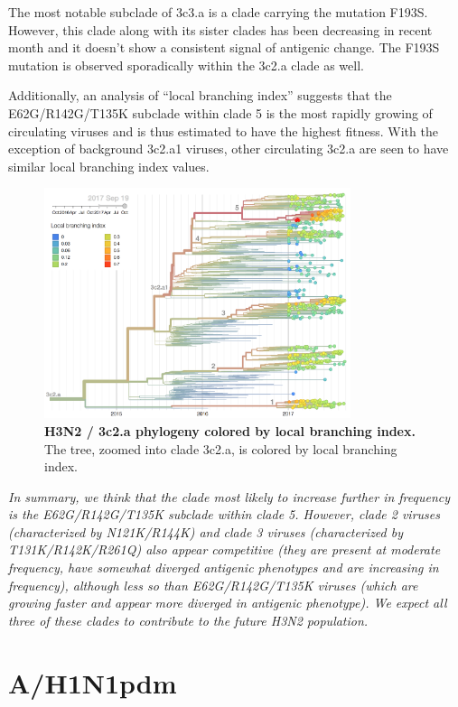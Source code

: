 \documentclass[11pt,oneside,letterpaper]{article}
\begin{document}
The most notable subclade of 3c3.a is a clade carrying the mutation
F193S. However, this clade along with its sister clades has been
decreasing in recent month and it doesn't show a consistent signal of
antigenic change. The F193S mutation is observed sporadically within
the 3c2.a clade as well.

Additionally, an analysis of ``local branching index'' \cite{neher2014predicting} suggests that the E62G/R142G/T135K subclade within clade 5 is the most rapidly growing of circulating viruses and is thus estimated to have the highest fitness.
With the exception of background 3c2.a1 viruses, other circulating 3c2.a are seen to have similar local branching index values.

\begin{figure}[h!]
  \centering
  \includegraphics[width=0.8\textwidth]{../figures/sep-2017/h3n2_tree_lbi.png}
	\caption{\textbf{H3N2 / 3c2.a phylogeny colored by local branching index.}
  The tree, zoomed into clade 3c2.a, is colored by local branching index.
  }
  \label{h3n2_tree_dfreq}
\end{figure}

\textit{In summary, we think that the clade most likely to increase further in frequency is the E62G/R142G/T135K subclade within clade 5.
However, clade 2 viruses (characterized by N121K/R144K) and clade 3 viruses (characterized by T131K/R142K/R261Q) also appear competitive (they are present at moderate frequency, have somewhat diverged antigenic phenotypes and are increasing in frequency), although less so than E62G/R142G/T135K viruses (which are growing faster and appear more diverged in antigenic phenotype).
We expect all three of these clades to contribute to the future H3N2 population.}


\clearpage
\section*{A/H1N1pdm}
\end{document}
